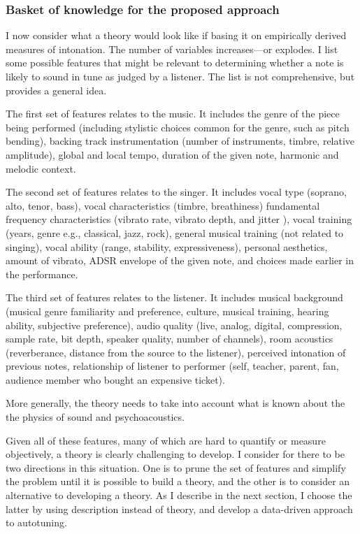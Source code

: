 \subsubsection{Basket of knowledge for the proposed approach}
I now consider what a theory would look like if basing it on empirically derived measures of intonation. The number of variables increases---or explodes. I list some possible features that might be relevant to determining whether a note is likely to sound in tune as judged by a listener. The list is not comprehensive, but provides a general idea.

The first set of features relates to the music. It includes the genre of the piece being performed (including stylistic choices common for the genre, such as pitch bending), backing track instrumentation (number of instruments, timbre, relative amplitude), global and local tempo, duration of the given note, harmonic and melodic context.

The second set of features relates to the singer. It includes vocal type (soprano, alto, tenor, bass), vocal characteristics (timbre, breathiness) fundamental frequency characteristics (vibrato rate, vibrato depth, and jitter \cite{devaney2020new}), vocal training (years, genre e.g., classical, jazz, rock), general musical training (not related to singing), vocal ability (range, stability, expressiveness), personal aesthetics, amount of vibrato, ADSR envelope of the given note, and choices made earlier in the performance.

The third set of features relates to the listener. It includes musical background (musical genre familiarity and preference, culture, musical training, hearing ability, subjective preference), audio quality (live, analog, digital, compression, sample rate, bit depth, speaker quality, number of channels), room acoustics (reverberance, distance from the source to the listener), perceived intonation of previous notes, relationship of listener to performer (self, teacher, parent, fan, audience member who bought an expensive ticket).

More generally, the theory needs to take into account what is known about the the physics of sound and psychoacoustics.

Given all of these features, many of which are hard to quantify or measure objectively, a theory is clearly challenging to develop. I consider for there to be two directions in this situation. One is to prune the set of features and simplify the problem until it is possible to build a theory, and the other is to consider an alternative to developing a theory. As I describe in the next section, I choose the latter by using description instead of theory, and develop a data-driven approach to autotuning.

